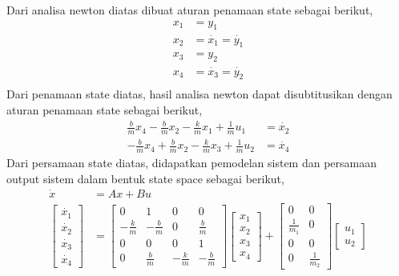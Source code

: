 \documentclass[../main.tex]{subfiles}
\begin{document}
            Dari analisa newton diatas dibuat aturan penamaan state sebagai berikut,
            \begin{equation}
                \begin{split}
                    x_1 &= y_1 \\[5pt]
                    x_2 &= \dot{x_1} = \dot{y_1} \\[5pt]
                    x_3 &= y_2 \\[5pt]
                    x_4 &= \dot{x_3} = \dot{y_2} \\[5pt]
                \end{split}
            \end{equation}
            Dari penamaan state diatas, hasil analisa newton dapat disubtitusikan dengan aturan penamaan state sebagai berikut,
            \begin{equation}
                \begin{split}
                    \frac{b}{m} x_4 - \frac{b}{m} x_2 - \frac{k}{m} x_1 + \frac{1}{m} u_1 &= \dot{x_2} \\[5pt]
                    - \frac{b}{m} x_4 + \frac{b}{m} x_2 - \frac{k}{m} x_3 + \frac{1}{m} u_2 &= \dot{x_4}
                \end{split}
            \end{equation}
            Dari persamaan state diatas, didapatkan pemodelan sistem dan persamaan output sistem dalam bentuk state space sebagai berikut,
            \begin{equation}
                \begin{split}
                    \dot{x} &= Ax +Bu \\[10pt]
                    \begin{bmatrix} \dot{x_1} \\ \dot{x_2} \\ \dot{x_3} \\ \dot{x_4} \end{bmatrix} &= \begin{bmatrix} 0 & 1 & 0 & 0 \\ -\frac{k}{m} & -\frac{b}{m} & 0 & \frac{b}{m} \\ 0 & 0 & 0 & 1 \\ 0 & \frac{b}{m} & -\frac{k}{m} & -\frac{b}{m} \end{bmatrix} \begin{bmatrix} x_1 \\ x_2 \\ x_3 \\ x_4 \end{bmatrix} + \begin{bmatrix} 0 & 0 \\ \frac{1}{m_1} & 0 \\ 0 & 0 \\ 0 & \frac{1}{m_2} \end{bmatrix} \begin{bmatrix} u_1 \\ u_2 \end{bmatrix}
                \end{split}
            \end{equation}
\end{document}
